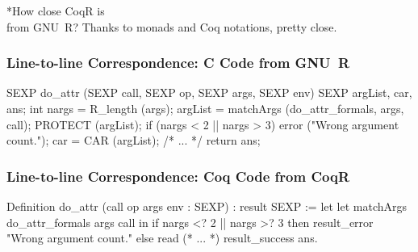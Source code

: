 \documentclass{beamer}
\begin{document}
\sectionframe**{How close CoqR is\\from GNU~R?}{
    \vfill
    \centering{}
    \textcolor{DarkPlum}{Thanks to monads and Coq notations, pretty close.}
}

\begin{frame}[fragile]
    \frametitle{Line-to-line Correspondence: C Code from GNU~R}

\begin{changemargin}{-5mm}{-5mm}
\begin{ccode}
SEXP do_attr
    (SEXP call, SEXP op, SEXP args, SEXP env){
  SEXP argList, car, ans;
  int nargs = R_length (args);
  argList =
    matchArgs (do_attr_formals, args, call);
  PROTECT (argList);
  if (nargs < 2 || nargs > 3)
    error ("Wrong argument count.");
  car = CAR (argList);
  /* ... */
  return ans;
}
\end{ccode}
\end{changemargin}

\end{frame}

\begin{frame}[fragile]
    \frametitle{Line-to-line Correspondence: Coq Code from CoqR}

\begin{changemargin}{-5mm}{-5mm}
\begin{coqcode}
Definition do_attr
    (call op args env : SEXP)
    : result SEXP :=
  let%
  let%
    matchArgs do_attr_formals args call in
  if nargs <? 2 || nargs >? 3 then
    result_error "Wrong argument count."
  else
    read%
    (* ... *)
    result_success ans.
\end{coqcode}
\end{changemargin}

\end{frame}
\end{document}
